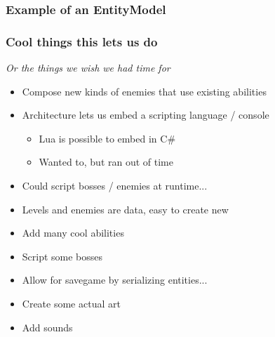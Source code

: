 \documentclass[screen]{beamer}
\begin{document}
\begin{frame}
  \frametitle{Example of an EntityModel}
  
\end{frame}

\begin{frame}
  \frametitle{Cool things this lets us do}
  \emph{Or the things we wish we had time for}
  \begin{itemize}
    \item Compose new kinds of enemies that use existing abilities
    \item Architecture lets us embed a scripting language / console
      \begin{itemize}
        \item Lua is possible to embed in C\#
        \item Wanted to, but ran out of time
      \end{itemize}
    \item Could script bosses / enemies at runtime...
    \item Levels and enemies are data, easy to create new
    \item Add many cool abilities
    \item Script some bosses
    \item Allow for savegame by serializing entities...
    \item Create some actual art
    \item Add sounds
  \end{itemize}
\end{frame}
\end{document}
